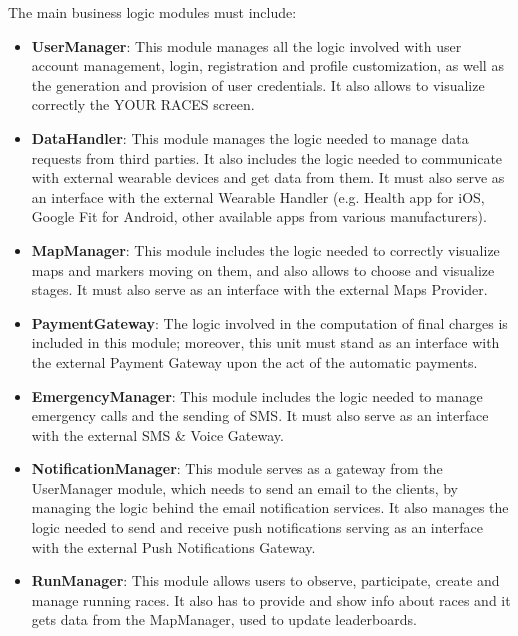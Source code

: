 The main business logic modules must include:
\begin{itemize}
\item \textbf{UserManager}: This module manages all the logic involved with user account management, login, registration and profile customization, as well as the generation and provision of user credentials. It also allows to visualize correctly the YOUR RACES screen.

\item \textbf{DataHandler}: This module manages the logic needed to manage data requests from third parties. It also includes the logic needed to communicate with external wearable devices and get data from them. It must also serve as an interface with the external Wearable Handler (e.g. Health app for iOS, Google Fit for Android, other available apps from various manufacturers).

\item \textbf{MapManager}: This module includes the logic needed to correctly visualize maps and markers moving on them, and also allows to choose and visualize stages. It must also serve as an interface with the external Maps Provider.

\item \textbf{PaymentGateway}: The logic involved in the computation of final charges is included in this module; moreover, this unit must stand as an interface with the external Payment Gateway upon the act of the automatic payments.

\item \textbf{EmergencyManager}: This module includes the logic needed to manage emergency calls and the sending of SMS. It must also serve as an interface with the external SMS \& Voice Gateway.

\item \textbf{NotificationManager}: This module serves as a gateway from the UserManager module, which needs to send an email to the clients, by managing the logic behind the email notification services. It also manages the logic needed to send and receive push notifications serving as an interface with the external Push Notifications Gateway.

\item \textbf{RunManager}: This module allows users to observe, participate, create and manage running races. It also has to provide and show info about races and it gets data from the MapManager, used to update leaderboards.
\end{itemize}

